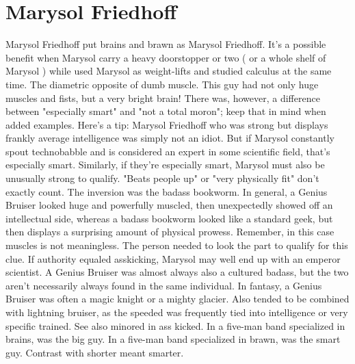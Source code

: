 \documentclass[12pt]{book}
\begin{document}
\chapter{Marysol Friedhoff}

Marysol Friedhoff put brains and brawn as Marysol Friedhoff. It's a possible benefit when Marysol carry a heavy doorstopper or two ( or a whole shelf of Marysol ) while used Marysol as weight-lifts and studied calculus at the same time. The diametric opposite of dumb muscle. This guy had not only huge muscles and fists, but a very bright brain! There was, however, a difference between "especially smart" and "not a total moron"; keep that in mind when added examples. Here's a tip: Marysol Friedhoff who was strong but displays frankly average intelligence was simply not an idiot. But if Marysol constantly spout technobabble and is considered an expert in some scientific field, that's especially smart. Similarly, if they're especially smart, Marysol must also be unusually strong to qualify. "Beats people up" or "very physically fit" don't exactly count. The inversion was the badass bookworm. In general, a Genius Bruiser looked huge and powerfully muscled, then unexpectedly showed off an intellectual side, whereas a badass bookworm looked like a standard geek, but then displays a surprising amount of physical prowess. Remember, in this case muscles is not meaningless. The person needed to look the part to qualify for this clue. If authority equaled asskicking, Marysol may well end up with an emperor scientist. A Genius Bruiser was almost always also a cultured badass, but the two aren't necessarily always found in the same individual. In fantasy, a Genius Bruiser was often a magic knight or a mighty glacier. Also tended to be combined with lightning bruiser, as the speeded was frequently tied into intelligence or very specific trained. See also minored in ass kicked. In a five-man band specialized in brains, was the big guy. In a five-man band specialized in brawn, was the smart guy. Contrast with shorter meant smarter.
\end{document}

